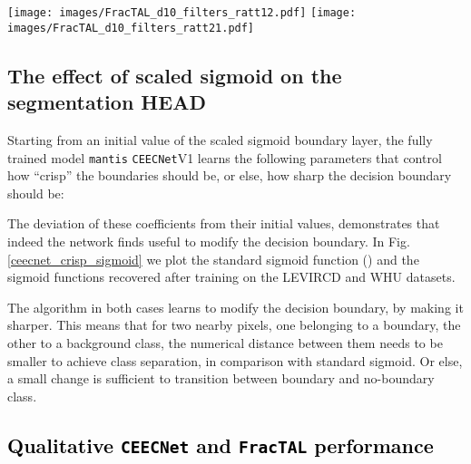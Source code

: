 \documentclass[times, 5p]{elsarticle}
\def \FracTAL {\texttt{FracTAL} }
\newcommand{\ceecnet}{\texttt{CEECNet}}
\newcommand{\mantis}{\texttt{mantis}}
\begin{document}
\begin{figure*}
\centering
\texttt{[image: images/FracTAL\_d10\_filters\_ratt12.pdf]}
\texttt{[image: images/FracTAL\_d10\_filters\_ratt21.pdf]}
\caption{\textcolor{black}{Visualization of the relative attention units, \texttt{ratt12} (left pannel) and \texttt{ratt21} (right pannel), for the \texttt{mantis} \FracTAL \texttt{ResNet} with \FracTAL depth, . These come from the first feature extractors (channels=32, filter spatial size ). Here, \texttt{ratt12} is the relative attention where for query we use input at date , and the key/value filters are created from input at date . In the top left rows for each pannel we have input image at date , input image at date , and ground truth building change labels, followed by the visualization of each of the 32 channels of the features.}} 
\label{FracTAL_d10_ratt12_n_21}
\end{figure*}



\subsection{The effect of scaled sigmoid on the segmentation HEAD}

Starting from an initial value  of the scaled sigmoid boundary layer,  
 the fully trained model \mantis{} \ceecnet V1 learns the following parameters that control how ``crisp'' the boundaries should be, or else, how sharp the decision boundary should be:

The deviation of these coefficients from their initial values, demonstrates that indeed the network finds useful to modify the decision boundary. In Fig. \ref{ceecnet_crisp_sigmoid} we plot the standard sigmoid function () and the sigmoid functions recovered after training on the LEVIRCD and WHU datasets. 

The algorithm in both cases learns to modify the decision boundary, by making it sharper. This means that for two nearby pixels, one belonging to a boundary, the other to a background class, the numerical distance between them needs to be smaller to achieve class separation, in comparison with standard sigmoid. Or else, a small  change is sufficient to transition between boundary and no-boundary class. 



\subsection{\textcolor{black}{Qualitative \ceecnet{}  and \FracTAL performance}}
\label{ceecnet_vs_resnet_qualititative}
\end{document}
